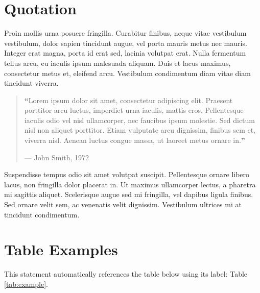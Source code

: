 \documentclass[a4paper]{CSMakotoTechnicalReport}
\begin{document}
\begin{multicols}{2}
    \section{Quotation}

    Proin mollis urna posuere fringilla. Curabitur finibus, neque vitae vestibulum vestibulum, dolor sapien tincidunt augue, vel porta mauris metus nec mauris. Integer erat magna, porta id erat sed, lacinia volutpat erat. Nulla fermentum tellus arcu, eu iaculis ipsum malesuada aliquam. Duis et lacus maximus, consectetur metus et, eleifend arcu. Vestibulum condimentum diam vitae diam tincidunt viverra.

    \begin{quote}
        \textbf{\LARGE ``}Lorem ipsum dolor sit amet, consectetur adipiscing elit. Praesent porttitor arcu luctus, imperdiet urna iaculis, mattis eros. Pellentesque iaculis odio vel nisl ullamcorper, nec faucibus ipsum molestie. Sed dictum nisl non aliquet porttitor. Etiam vulputate arcu dignissim, finibus sem et, viverra nisl. Aenean luctus congue massa, ut laoreet metus ornare in.\textbf{''}

        \hfill--- John Smith, 1972
    \end{quote}

    Suspendisse tempus odio sit amet volutpat suscipit. Pellentesque ornare libero lacus, non fringilla dolor placerat in. Ut maximus ullamcorper lectus, a pharetra mi sagittis aliquet. Scelerisque augue sed mi fringilla, vel dapibus ligula finibus. Sed ornare velit sem, ac venenatis velit dignissim. Vestibulum ultrices mi at tincidunt condimentum.


    \section{Table Examples}

    This statement automatically references the table below using its label: Table \ref{tab:example}.



\end{multicols}
\end{document}
